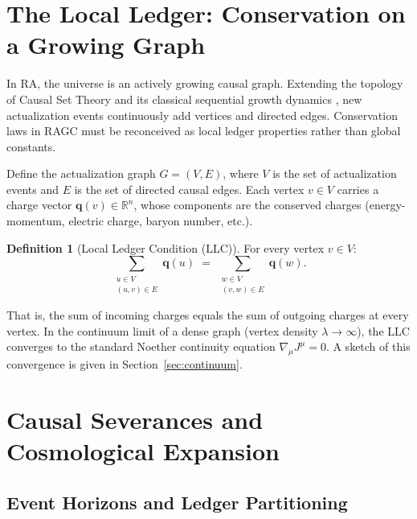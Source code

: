 \documentclass[11pt,a4paper]{article}
\theoremstyle{plain}
\theoremstyle{definition}
\newtheorem{definition}[theorem]{Definition}
\theoremstyle{remark}
\begin{document}
\section{The Local Ledger: Conservation on a Growing Graph}
\label{sec:ledger}

In RA, the universe is an actively growing causal graph. Extending the topology
of Causal Set Theory \citep{Dowker2005} and its classical sequential growth
dynamics \citep{RideoutSorkin2000}, new actualization events continuously add
vertices and directed edges. Conservation laws in RAGC must be reconceived as
local ledger properties rather than global constants.

Define the actualization graph $G = (V, E)$, where $V$ is the set of actualization
events and $E$ is the set of directed causal edges. Each vertex $v \in V$ carries
a charge vector $\mathbf{q}(v) \in \mathbb{R}^{n}$, whose components are the
conserved charges (energy-momentum, electric charge, baryon number, etc.).

\begin{definition}[Local Ledger Condition (LLC)]
For every vertex $v \in V$:
\begin{equation}
  \sum_{\substack{u \in V \\ (u,v)\in E}} \mathbf{q}(u)
  \;=\;
  \sum_{\substack{w \in V \\ (v,w)\in E}} \mathbf{q}(w).
\end{equation}
\end{definition}

That is, the sum of incoming charges equals the sum of outgoing charges at every
vertex. In the continuum limit of a dense graph (vertex density $\lambda \to
\infty$), the LLC converges to the standard Noether continuity equation
$\nabla_{\mu}J^{\mu} = 0$. A sketch of this convergence is given in
Section~\ref{sec:continuum}.

\section{Causal Severances and Cosmological Expansion}
\label{sec:severances}

\subsection{Event Horizons and Ledger Partitioning}
\end{document}
